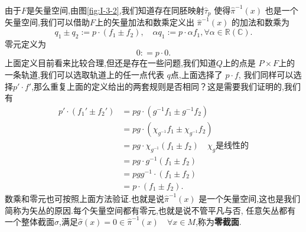 \documentclass[../main.tex]{subfiles}
\begin{document}
由于$F$是矢量空间,由图\ref{fig:I-3-2},我们知道存在同胚映射$\hat{\tau}_p$ 使得$\hat{\pi}^{-1}(x)$ 也是一个矢量空间,我们可以借助$F$上的矢量加法和数乘定义出
$\hat{\pi}^{-1}(x)$ 的加法和数乘为\[
  q_1\pm q_2 := p\cdot(f_1 \pm f_2), \quad \alpha q_1 := p \cdot \alpha f_1, \forall \alpha \in \mathbb{R}(\mathbb{C}) 
.\] 
零元定义为\[
0 : = p\cdot 0
.\] 
上面定义目前看来比较合理,但还是存在一些问题,我们知道$Q$上的点是 $P\times F$上的一条轨道,我们可以选取轨道上的任一点代表 $q$点,上面选择了 $p\cdot f$,
我们同样可以选择$p' \cdot f'$,那么重复上面的定义给出的两套规则是否相同？这是需要我们证明的,我们有
\begin{align*}
  p' \cdot (f_1' \pm f_2')&= pg \cdot (g^{-1}f_1 \pm g^{-1}f_2)\\
                          &= pg \cdot(\chi_{g^{-1}}f_1 \pm \chi_{g^{-1}}f_2)\\
                          & = pg \cdot \chi_{g^{-1}}(f_1 \pm f_2)\quad \chi_g\text{是线性的}\\
                          & = pg \cdot g^{-1}(f_1 \pm f_2)\\
                          & = p gg^{-1} \cdot (f_1 \pm f_2)\\
                          & = p \cdot (f_1 \pm f_2) 
.\end{align*}
数乘和零元也可按照上面方法验证.也就是说$\hat{\pi}^{-1}(x)$ 是一个矢量空间,这也是我们简称为矢丛的原因.每个矢量空间都有零元,也就是说不管平凡与否,
任意矢丛都有一个整体截面$\hat{\sigma}$,满足$\hat{\sigma}(x) = 0 \in \hat{\pi}^{-1}(x)\quad \forall x\in M$,称为\textbf{零截面}.
\end{document}
